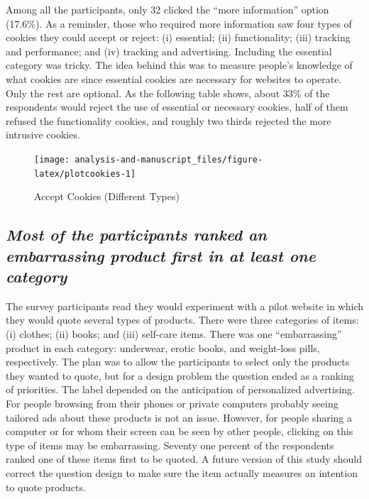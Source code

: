 \documentclass[
  11pt,
  letterpaper,
]{article}
\begin{document}
Among all the participants, only 32 clicked the ``more information'' option (17.6\%). As a reminder, those who required more information saw four types of cookies they could accept or reject: (i) essential; (ii) functionality; (iii) tracking and performance; and (iv) tracking and advertising. Including the essential category was tricky. The idea behind this was to measure people's knowledge of what cookies are since essential cookies are necessary for websites to operate. Only the rest are optional. As the following table shows, about 33\% of the respondents would reject the use of essential or necessary cookies, half of them refused the functionality cookies, and roughly two thirds rejected the more intrusive cookies.

\begin{figure}

{\centering \texttt{[image: analysis-and-manuscript\_files/figure-latex/plotcookies-1]} 

}

\caption{Accept Cookies (Different Types)}\label{fig:plotcookies}
\end{figure}

\hypertarget{most-of-the-participants-ranked-an-embarrassing-product-first-in-at-least-one-category}{%
\subsection{\texorpdfstring{\emph{Most of the participants ranked an embarrassing product first in at least one category}}{Most of the participants ranked an embarrassing product first in at least one category}}\label{most-of-the-participants-ranked-an-embarrassing-product-first-in-at-least-one-category}}

The survey participants read they would experiment with a pilot website in which they would quote several types of products. There were three categories of items: (i) clothes; (ii) books; and (iii) self-care items. There was one ``embarrassing'' product in each category: underwear, erotic books, and weight-loss pills, respectively. The plan was to allow the participants to select only the products they wanted to quote, but for a design problem the question ended as a ranking of priorities. The label depended on the anticipation of personalized advertising. For people browsing from their phones or private computers probably seeing tailored ads about these products is not an issue. However, for people sharing a computer or for whom their screen can be seen by other people, clicking on this type of items may be embarrassing. Seventy one percent of the respondents ranked one of these items first to be quoted. A future version of this study should correct the question design to make sure the item actually measures an intention to quote products.
\end{document}
